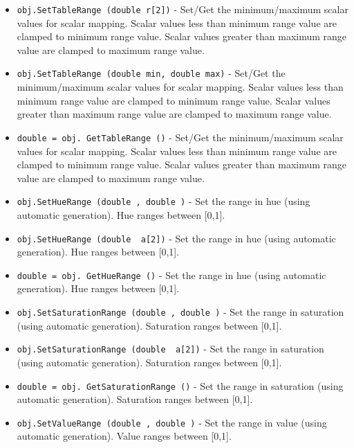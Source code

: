 \begin{itemize}
\item  \verb|obj.SetTableRange (double r[2])| -  Set/Get the minimum/maximum scalar values for scalar mapping. Scalar
 values less than minimum range value are clamped to minimum range value.
 Scalar values greater than maximum range value are clamped to maximum
 range value.

\item  \verb|obj.SetTableRange (double min, double max)| -  Set/Get the minimum/maximum scalar values for scalar mapping. Scalar
 values less than minimum range value are clamped to minimum range value.
 Scalar values greater than maximum range value are clamped to maximum
 range value.

\item  \verb|double = obj. GetTableRange ()| -  Set/Get the minimum/maximum scalar values for scalar mapping. Scalar
 values less than minimum range value are clamped to minimum range value.
 Scalar values greater than maximum range value are clamped to maximum
 range value.

\item  \verb|obj.SetHueRange (double , double )| -  Set the range in hue (using automatic generation). Hue ranges 
 between [0,1].

\item  \verb|obj.SetHueRange (double  a[2])| -  Set the range in hue (using automatic generation). Hue ranges 
 between [0,1].

\item  \verb|double = obj. GetHueRange ()| -  Set the range in hue (using automatic generation). Hue ranges 
 between [0,1].

\item  \verb|obj.SetSaturationRange (double , double )| -  Set the range in saturation (using automatic generation). Saturation 
 ranges between [0,1].

\item  \verb|obj.SetSaturationRange (double  a[2])| -  Set the range in saturation (using automatic generation). Saturation 
 ranges between [0,1].

\item  \verb|double = obj. GetSaturationRange ()| -  Set the range in saturation (using automatic generation). Saturation 
 ranges between [0,1].

\item  \verb|obj.SetValueRange (double , double )| -  Set the range in value (using automatic generation). Value ranges 
 between [0,1].


\end{itemize}
